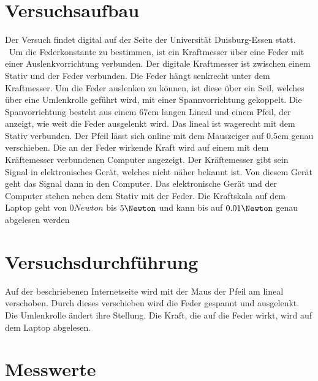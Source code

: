 


\section{Versuchsaufbau}
Der Versuch findet digital auf der Seite der Universität Duisburg-Essen 
\cite{Hook_Interaktiv} statt. \
Um die Federkonstante zu bestimmen, ist ein Kraftmesser über eine Feder mit einer Auslenkvorrichtung verbunden.
Der digitale Kraftmesser ist zwischen einem Stativ und der Feder verbunden. Die Feder hängt senkrecht unter dem Kraftmesser.
Um die Feder auslenken zu können, ist diese über ein Seil, welches über eine Umlenkrolle geführt wird, mit einer 
Spannvorrichtung gekoppelt. Die Spanvorrichtung besteht aus einem $67 \unit{\centi \meter}$ langen Lineal und einem Pfeil, 
der anzeigt, wie weit die Feder ausgelenkt wird. Das lineal ist wagerecht mit dem Stativ verbunden. Der Pfeil lässt sich online 
mit dem Mauszeiger auf $0.5 \unit{\centi \meter}$ genau verschieben. %
Die an der Feder wirkende Kraft wird auf einem mit dem Kräftemesser verbundenen Computer angezeigt. Der Kräftemesser 
gibt sein Signal in elektronisches Gerät, welches nicht näher bekannt ist. Von diesem Gerät geht das Signal dann in den 
Computer. Das elektronische Gerät und der Computer stehen neben dem Stativ mit der Feder. Die Kraftskala auf dem Laptop geht 
von $0 \unit{Newton}$ bis $5 \unit{\Newton}$ und kann bis auf $0.01 \unit{\Newton}$ genau abgelesen werden


\section{Versuchsdurchführung}
Auf der beschriebenen Internetseite wird mit der Maus der Pfeil am lineal verschoben. Durch dieses verschieben wird die Feder 
gespannt und ausgelenkt. Die Umlenkrolle ändert ihre Stellung. Die Kraft, die auf die Feder wirkt, wird auf dem Laptop 
abgelesen.

\section{Messwerte}

\label{sec:Durchführung}



